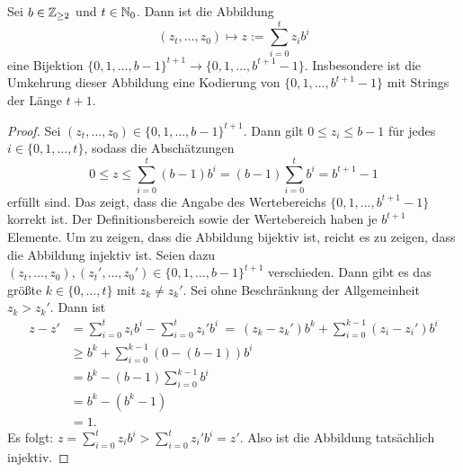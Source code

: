 \begin{prop}
	Sei $b \in \mathbb{Z}_{\ge 2}$ und $t \in \mathbb{N}_0$. Dann ist die Abbildung 
	\begin{equation}
	(z_t,\ldots,z_0) \mapsto z:= \sum_{i=0}^t z_i b^i
	\end{equation}
	eine Bijektion $\{0,1,\ldots,b-1\}^{t+1} \to \{0,1,\ldots,b^{t+1} - 1\}$. Insbesondere ist die Umkehrung dieser Abbildung eine Kodierung von $\{0,1,\ldots,b^{t+1} -1\}$ mit Strings der Länge $t+1$.
\end{prop} 
\begin{proof}
 Sei $(z_t,\ldots,z_0) \in \{0,1,\ldots,b-1\}^{t+1}$. Dann gilt $0 \le z_i  \le b-1$ für jedes $i  \in \{0,1,\ldots,t\}$, sodass die Abschätzungen
 \[
 	0 \le z \le \sum_{i=0}^t (b-1) b^i = (b-1) \sum_{i=0}^t b^i = b^{t+1} -1
 \]
 erfüllt sind. Das zeigt, dass die Angabe des Wertebereichs $\{0,1,\ldots,b^{t+1} -1\}$ korrekt ist.
 Der Definitionsbereich sowie der Wertebereich haben je $b^{t+1}$ Elemente. Um zu zeigen, dass die Abbildung bijektiv ist, reicht es zu zeigen, dass die Abbildung injektiv ist. Seien dazu $(z_t,\ldots,z_0), (z_t',\ldots,z_0') \in \{0,1,\ldots,b-1\}^{t+1}$ verschieden. Dann gibt es das größte $k\in \{0,\ldots,t\}$ mit $z_k \ne z_k'$. Sei ohne Beschränkung der Allgemeinheit $z_k>z_k'$. Dann ist 
 \begin{align*}
 		z - z' &= \sum_{i=0}^t z_i b^i - \sum_{i=0}^t z_i' b^i \ = \ (z_k - z_k')b^k + \sum_{i=0}^{k-1} (z_i -z_i') b^i
 		\\ &\ge b^k + \sum_{i=0}^{k-1} (0 - (b-1)) b^i 
 		\\ &= b^k - (b-1) \sum_{i=0}^{k-1} b^i
 		\\ &= b^k - (b^k - 1) 
 		\\ &= 1.
 \end{align*}
Es folgt: $z = \sum_{i=0}^t z_i b^i > \sum_{i=0}^t z_i' b^i = z'$. Also ist die Abbildung tatsächlich injektiv. 
\end{proof} 

